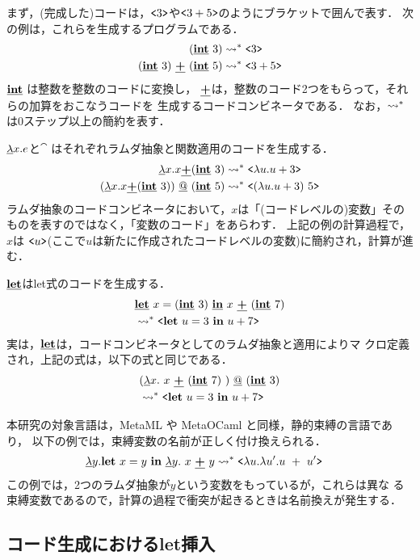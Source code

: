 まず，(完成した)コードは，$\code{3}$や$\code{3+5}$のようにブラケットで囲んで表す．
次の例は，これらを生成するプログラムである．
\begin{align*}
  (\cint~3)   & \too \code{3} \\
  (\cint~3)~ \cPlus~ (\cint~5) & \too \code{3 + 5}
\end{align*}
$\cint$ は整数を整数のコードに変換し，
$\cPlus$は，整数のコード2つをもらって，それらの加算をおこなうコードを
生成するコードコンビネータである．
なお，$\too$は0ステップ以上の簡約を表す．

$\cfun{x}{e}$と$\cat$ はそれぞれラムダ抽象と関数適用のコードを生成する．
\begin{align*}
  \cfun{x}{x \cPlus (\cint~3)}   & \too \code{\fun{u}{u+3}} \\
  (\cfun{x}{x \cPlus (\cint~3)}) \cat (\cint~5) & \too
                                                  \code{(\fun{u}{u+3})~5}
\end{align*}
ラムダ抽象のコードコンビネータにおいて，$x$は「(コードレベルの)変数」その
ものを表すのではなく，「変数のコード」をあらわす．
上記の例の計算過程で，$x$は
$\code{u}$(ここで$u$は新たに作成されたコードレベルの変数)に簡約され，計算が進む．

$\cLet$はlet式のコードを生成する．
\begin{align*}
  & \clet{x}{(\cint~3)}{x~ \cPlus~ (\cint~7)} \\
  & \too \code{\Let~ u = 3~ \In~ u + 7}
\end{align*}
実は，$\cLet$は，コードコンビネータとしてのラムダ抽象と適用によりマ
クロ定義され，上記の式は，以下の式と同じである．
\begin{align*}
  & (\cfun{x}{~x~ \cPlus~ (\cint~7)~}) \cat (\cint~3)  \\
  & \too \code{\Let~ u = 3~ \In~ u + 7}
\end{align*}

本研究の対象言語は，MetaML や MetaOCaml と同様，静的束縛の言語であり，
以下の例では，束縛変数の名前が正しく付け換えられる．
\begin{align*}
  \cfun{y}{\Let~ x = y~ \In~ \cfun{y}{~x~ \cPlus~ y}{}}{}
  & \too \code{\fun{u}{\fun{u'}{u~ +~ u'}}}
\end{align*}
この例では，2つのラムダ抽象が$y$という変数をもっているが，これらは異な
る束縛変数であるので，計算の過程で衝突が起きるときは名前換えが発生する．

\subsection{コード生成におけるlet挿入}


